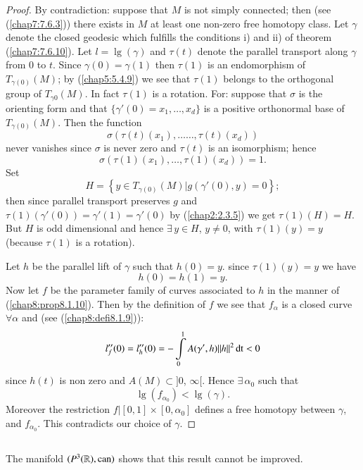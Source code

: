 \begin{proof}
By \pageoriginale contradiction: suppose that $M$ is not simply
connected; then (see (\ref{chap7:7.6.3})) there exists in $M$ at least one
non-zero free homotopy class. Let $\gamma$ denote the closed geodesic
which fulfills the conditions i) and ii) of theorem
(\ref{chap7:7.6.10}). Let $l=\lg(\gamma)$ and $\tau(t)$ denote the
parallel transport along $\gamma$ from $0$ to $t$. Since
$\gamma(0)=\gamma(1)$ then $\tau(1)$ is an endomorphism of
$T_{\gamma(0)}(M)$; by (\ref{chap5:5.4.9}) we see that $\tau(1)$ belongs
to the orthogonal group of $T_{\gamma{0}}(M)$. In fact $\tau(1)$ is a
rotation. For: suppose that $\sigma$ is the orienting form and that
$\{\gamma'(0)=x_{1},\ldots,x_{d}\}$ is a positive orthonormal base of
$T_{\gamma(0)}(M)$. Then the function
$$
\sigma(\tau(t)(x_{1}),\ldots\ldots,\tau(t)(x_{d}))
$$
never vanishes since $\sigma$ is never zero and $\tau(t)$ is an
isomorphism; hence
$$
\sigma(\tau(1)(x_{1}),\ldots,\tau(1)(x_{d}))=1.
$$
Set
$$
H=\left\{y\in T_{\gamma(0)}(M)|g(\gamma'(0),y)=0\right\};
$$
then since parallel transport preserves $g$ and
$\tau(1)(\gamma'(0))=\gamma'(1)=\gamma'(0)$ by (\ref{chap2:2.3.5}) we get
$\tau(1)(H)=H$. But $H$ is odd dimensional and hence $\exists\, y\in
H$, $y\neq 0$, with $\tau(1)(y)=y$ (because $\tau(1)$ is a rotation).

Let $h$ be the parallel lift of $\gamma$ such that $h(0)=y$. since
$\tau(1)(y)=y$ we have
$$
h(0)=h(1)=y.
$$
Now \pageoriginale let $f$ be the parameter family of curves associated
to $h$ in the manner of (\ref{chap8:prop8.1.10}). Then by the definition of
$f$ we see that $f_{\alpha}$ is a closed curve $\forall\alpha$ and
(see (\ref{chap8:defi8.1.9})):
$$
l''_{f}(0)=l''_{h}(0)=-\int\limits^{1}_{0}A(\gamma',h)||h||^{2}\operatorname{dt}<0
$$
since $h(t)$ is non zero and $A(M)\subset ]0$, $\infty[$. Hence
    $\exists\, \alpha_{0}$ such that
$$
\lg(f_{\alpha_{0}})<\lg(\gamma).
$$
Moreover the restriction $f|[0,1]\times [0,\alpha_{0}]$ defines a free
homotopy between $\gamma$, and $f_{\alpha_{0}}$. This contradicts our
choice of $\gamma$.
\end{proof}

\setcounter{subsection}{11}

\subsection{}\label{chap8:8.3.12}

\begin{remark*}
The manifold $(P^{3}(\mathbb{R}),\operatorname{can})$ shows that this result cannot
be improved.
\end{remark*}

